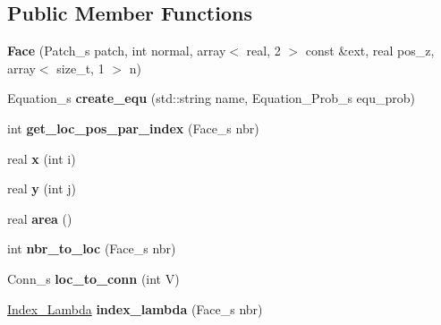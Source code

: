 \subsection*{Public Member Functions}
\begin{DoxyCompactItemize}
\item 
\hypertarget{classFace_a66d5955aa6386be0fd482a5ac1174229}{{\bfseries Face} (Patch\+\_\+s patch, int normal, array$<$ real, 2 $>$ const \&ext, real pos\+\_\+z, array$<$ size\+\_\+t, 1 $>$ n)}\label{classFace_a66d5955aa6386be0fd482a5ac1174229}

\item 
\hypertarget{classFace_a5e444cef6d1f3fb3b7d64a4799f59eb9}{Equation\+\_\+s {\bfseries create\+\_\+equ} (std\+::string name, Equation\+\_\+\+Prob\+\_\+s equ\+\_\+prob)}\label{classFace_a5e444cef6d1f3fb3b7d64a4799f59eb9}

\item 
\hypertarget{classFace_a7ebc4163752a05d82e184a3a4c8671b3}{int {\bfseries get\+\_\+loc\+\_\+pos\+\_\+par\+\_\+index} (Face\+\_\+s nbr)}\label{classFace_a7ebc4163752a05d82e184a3a4c8671b3}

\item 
\hypertarget{classFace_aed5980668f26bc29338dfa11b32919f5}{real {\bfseries x} (int i)}\label{classFace_aed5980668f26bc29338dfa11b32919f5}

\item 
\hypertarget{classFace_a9a4d892bf5e8782c898e15aa5a989806}{real {\bfseries y} (int j)}\label{classFace_a9a4d892bf5e8782c898e15aa5a989806}

\item 
\hypertarget{classFace_a2d20ebd0d99063967bb26657abebbcbe}{real {\bfseries area} ()}\label{classFace_a2d20ebd0d99063967bb26657abebbcbe}

\item 
\hypertarget{classFace_a06eb55371bc742e523a9eb94a573209d}{int {\bfseries nbr\+\_\+to\+\_\+loc} (Face\+\_\+s nbr)}\label{classFace_a06eb55371bc742e523a9eb94a573209d}

\item 
\hypertarget{classFace_a60baec409a104a88e6622efa2f80122c}{Conn\+\_\+s {\bfseries loc\+\_\+to\+\_\+conn} (int V)}\label{classFace_a60baec409a104a88e6622efa2f80122c}

\item 
\hypertarget{classFace_a9a5eb93863dc767848261afa813ca039}{\hyperlink{structIndex__Lambda}{Index\+\_\+\+Lambda} {\bfseries index\+\_\+lambda} (Face\+\_\+s nbr)}\label{classFace_a9a5eb93863dc767848261afa813ca039}


\end{DoxyCompactItemize}
